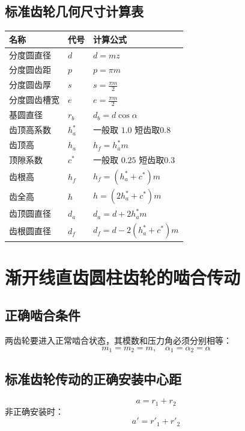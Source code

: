 \subsection{标准齿轮几何尺寸计算表}
\begin{table}[H]
	\centering
	\color{structurecolor}
	\begin{tabular}{lll}
		\hline
		\textbf{名称} & \textbf{代号} & \textbf{计算公式} \\ \hline
		分度圆直径 & $d$ & $d = mz$ \\
		分度圆齿距 & $p$ & $p = \pi m$ \\
		分度圆齿厚 & $s$ & $s = \frac{\pi m}{2} $ \\
		分度圆齿槽宽 & $e$ & $e = \frac{\pi m}{2} $ \\
		基圆直径 & $r_b$ & $d_b = d \cos \alpha$ \\
		齿顶高系数 & $h_a^*$ & 一般取 $1.0$  短齿取$0.8$\\
		齿顶高 &$h_a$ & $h_f=h_a^* m$ \\
		顶隙系数 & $c^*$ & 一般取 $0.25$  短齿取$0.3$ \\
		齿根高 &$h_f$ & $h_f=(h_a^*+c^*) m$ \\
		齿全高 &$h$ & $h=(2h_a^*+c^*) m$ \\
		齿顶圆直径 & $d_a$ & $d_a = d + 2h_a^* m$ \\
		齿根圆直径 & $d_f$ & $d_f = d - 2(h_a^* + c^*)m$ \\ \hline
	\end{tabular}
\end{table}

\section{渐开线直齿圆柱齿轮的啮合传动}

\subsection{正确啮合条件}
两齿轮要进入正常啮合状态，其模数和压力角必须分别相等：
\begin{equation}
	m_1 = m_2 = m, \quad \alpha_1 = \alpha_2 = \alpha
\end{equation}

\subsection{标准齿轮传动的正确安装中心距}
\begin{equation}
	a = r_1 +r_2
\end{equation}
非正确安装时：
\begin{equation}
	a' = r'_1 +r'_2
\end{equation}

